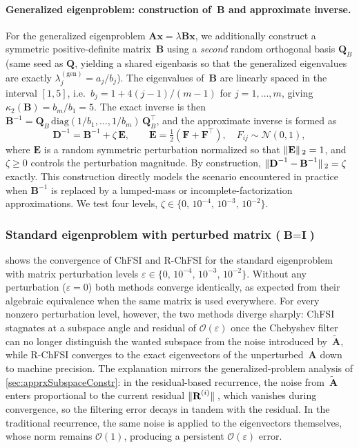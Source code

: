 \documentclass[preprint,3p,number,sort&compress]{elsarticle}
\newcommand{\bx}{\textbf{x}}
\newcommand{\bA}{\textbf{A}}
\newcommand{\bB}{\textbf{B}}
\newcommand{\bD}{\textbf{D}}
\newcommand{\bE}{\textbf{E}}
\newcommand{\bF}{\textbf{F}}
\newcommand{\bI}{\textbf{I}}
\newcommand{\bQ}{\textbf{Q}}
\newcommand{\bR}{\textbf{R}}
\newcommand{\cblue }{\color{black}}
\newcommand{\cn}{\color{black}}
\DeclarePairedDelimiter\norm{\lVert}{\rVert\,}%
\begin{document}
{\paragraph{Generalized eigenproblem: construction of~$\bB$ and approximate inverse.}
For the generalized eigenproblem $\bA\bx=\lambda\bB\bx$, we additionally construct a symmetric positive-definite matrix~$\bB$ using a \emph{second} random orthogonal basis $\bQ_B$ (same seed as $\bQ$, yielding a shared eigenbasis so that the generalized eigenvalues are exactly $\lambda_j^{(\mathrm{gen})}=a_j/b_j$). The eigenvalues of~$\bB$ are linearly spaced in the interval $[1,5]$, i.e.\ $b_j = 1 + 4(j-1)/(m-1)$ for $j=1,\dots,m$, giving $\kappa_2(\bB)=b_m/b_1=5$. The exact inverse is then $\bB^{-1}=\bQ_B\,\mathrm{diag}(1/b_1,\dots,1/b_m)\,\bQ_B^\top$, and the approximate inverse is formed as
\[
\bD^{-1} = \bB^{-1} + \zeta\,\bE, \qquad \bE = \tfrac{1}{2}(\bF+\bF^\top),\quad F_{ij}\sim\mathcal{N}(0,1),
\]
where $\bE$ is a random symmetric perturbation normalized so that $\norm{\bE}_2 = 1$, and $\zeta\geq 0$ controls the perturbation magnitude. By construction, $\norm{\bD^{-1}-\bB^{-1}}_2 = \zeta$ exactly. This construction directly models the scenario encountered in practice when $\bB^{-1}$ is replaced by a lumped-mass or incomplete-factorization approximations. We test four levels, $\zeta\in\{0,\,10^{-4},\,10^{-3},\,10^{-2}\}$.

\subsubsection{Standard eigenproblem with perturbed matrix (\texorpdfstring{$\bB=\bI$}{B=I})}\label{sec:toyStd}
{\cblue {} shows the convergence of ChFSI and R-ChFSI for the standard eigenproblem with matrix perturbation levels $\varepsilon\in\{0,\,10^{-4},\,10^{-3},\,10^{-2}\}$. Without any perturbation ($\varepsilon=0$) both methods converge identically, as expected from their algebraic equivalence when the same matrix is used everywhere.  For every nonzero perturbation level, however, the two methods diverge sharply: ChFSI stagnates at a subspace angle and residual of $\mathcal{O}(\varepsilon)$ once the Chebyshev filter can no longer distinguish the wanted subspace from the noise introduced by~$\tilde{\bA}$, while R-ChFSI converges to the exact eigenvectors of the unperturbed~$\bA$ down to machine precision.  The explanation mirrors the generalized-problem analysis of \cref{sec:apprxSubspaceConstr}: in the residual-based recurrence, the noise from~$\tilde{\bA}$ enters proportional to the current residual $\norm{\bR^{(i)}}$, which vanishes during convergence, so the filtering error decays in tandem with the residual.  In the traditional recurrence, the same noise is applied to the eigenvectors themselves, whose norm remains $\mathcal{O}(1)$, producing a persistent $\mathcal{O}(\varepsilon)$ error.\cn}

}
\end{document}

